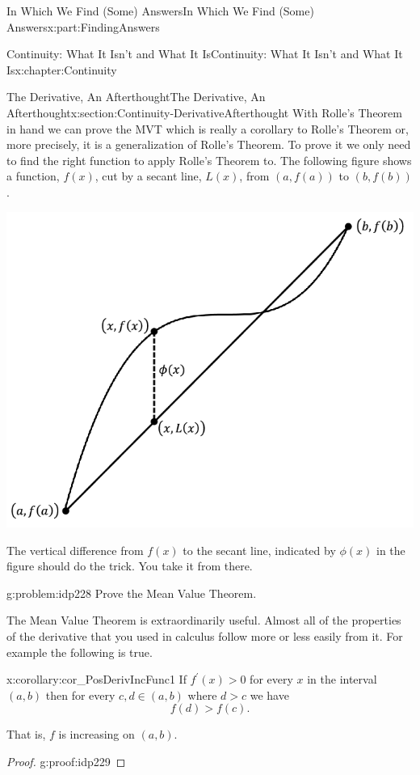\documentclass[oneside,10pt,]{book}
\numberwithin{equation}{section}
\begin{document}
\begin{partptx}{In Which We Find (Some) Answers}{}{In Which We Find (Some) Answers}{}{}{x:part:FindingAnswers}
\begin{chapterptx}{Continuity: What It Isn't and What It Is}{}{Continuity: What It Isn't and What It Is}{}{}{x:chapter:Continuity}
\begin{sectionptx}{The Derivative, An Afterthought}{}{The Derivative, An Afterthought}{}{}{x:section:Continuity-DerivativeAfterthought}
With Rolle's Theorem in hand we can prove the MVT which is really a corollary to Rolle's Theorem or, more precisely, it is a generalization of Rolle's Theorem.  To prove it we only need to find the right function to apply Rolle's Theorem to.  The following figure shows a function, \(f(x)\), cut by a secant line, \(L(x)\), from \((a, f(a))\) to \((b,f(b))\).%
\begin{image}{0.22}{0.56}{0.22}%
\includegraphics[width=\linewidth]{images/MVT.png}
\end{image}%
The vertical difference from \(f(x)\) to the secant line, indicated by \(\phi(x)\) in the figure should do the trick.  You take it from there.%
\begin{problem}{}{g:problem:idp228}%
 Prove the Mean Value Theorem.%
\end{problem}
The Mean Value Theorem is extraordinarily useful.  Almost all of the properties of the derivative that you used in calculus follow more or less easily from it.  For example the following is true.%
\begin{corollary}{}{}{x:corollary:cor_PosDerivIncFunc1}%
If \(f^\prime(x) > 0\) for every \(x\) in the interval \((a,b)\) then for every \(c,d\in(a,b)\) where \(d>c\) we have%
\begin{equation*}
f(d) >
f(c) \text{.}
\end{equation*}
%
\par
That is, \(f\) is increasing on \((a,b)\).%
\end{corollary}
\begin{proof}{}{g:proof:idp229}

\end{proof}
\end{sectionptx}
\end{chapterptx}
\end{partptx}
\end{document}

